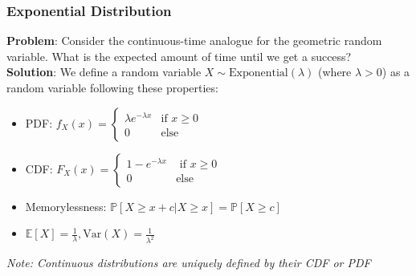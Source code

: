 \documentclass{beamer}
\begin{document}
\begin{frame}
    \frametitle{Exponential Distribution}
    {\bf Problem}: Consider the continuous-time analogue for the geometric random variable. What is the expected amount of time until we get a success?\\
    {\bf Solution}: We define a random variable $X\sim\text{Exponential}(\lambda)$ (where $\lambda>0$) as a random variable following these properties:
    \begin{itemize}
        \item PDF: $f_X(x)=\begin{cases}\lambda e^{-\lambda x}&\text{if }x\geq 0\\0&\text{else}\end{cases}$
        \item CDF: $F_X(x)=\begin{cases}1-e^{-\lambda x}&\text{ if }x\geq 0\\0&\text{else}\end{cases}$
        \item Memorylessness: $\mathbb{P}[X\geq x+c|X\geq x]=\mathbb{P}[X\geq c]$
        \item $\mathbb{E}[X]=\frac{1}{\lambda},\text{Var}(X)=\frac{1}{\lambda^2}$
    \end{itemize}
    {\it Note: Continuous distributions are uniquely defined by their CDF or PDF}
\end{frame}
\end{document}

